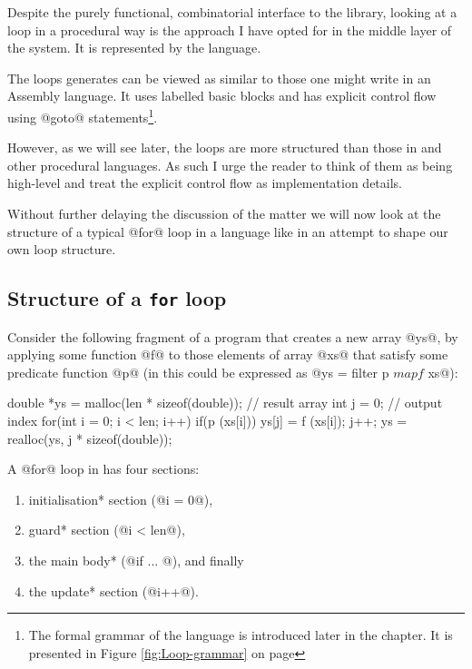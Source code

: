 \documentclass[preamble.tex]{subfiles}
\begin{document}
Despite the purely functional, combinatorial interface to the library, looking at a loop in a procedural way is the approach I have opted for in the middle layer of the system. It is represented by the \Loop language.\iloop

The loops \LiveFusion generates can be viewed as similar to those one might write in an Assembly language. It uses labelled basic blocks and has explicit control flow using @goto@ statements\footnote{The formal grammar of the \Loop language is introduced later in the chapter. It is presented in Figure \ref{fig:Loop-grammar} on page \pageref{fig:Loop-grammar}}.

However, as we will see later, the loops are more structured than those in \C and other procedural languages. As such I urge the reader to think of them as being high-level and treat the explicit control flow as implementation details.


Without further delaying the discussion of the matter we will now look at the structure of a typical @for@ loop in a language like \C in an attempt to shape our own loop structure.


\subsection{Structure of a \texttt{for} loop}

Consider the following fragment of a \C program that creates a new array @ys@, by applying some function @f@ to those elements of array @xs@ that satisfy some predicate function @p@ (in \Haskell this could be expressed as @ys = filter p $ map f $ xs@):

\begin{ccode}[numbers=left, label=lst:filterMapC]
double *ys = malloc(len * sizeof(double)); // result array
int j = 0;                                 // output index
for(int i = 0; i < len; i++) {
    if(p (xs[i])) {
        ys[j] = f (xs[i]);
        j++;
    }
}
ys = realloc(ys, j * sizeof(double));
\end{ccode}

A @for@ loop in \C has four sections:

\begin{enumerate}
\halfspacing
\item \*initialisation* section (@i = 0@),
\item \*guard* section (@i < len@),
\item the main \*body* (@if ... @), and finally
\item the \*update* section (@i++@).
\end{enumerate}
\end{document}
